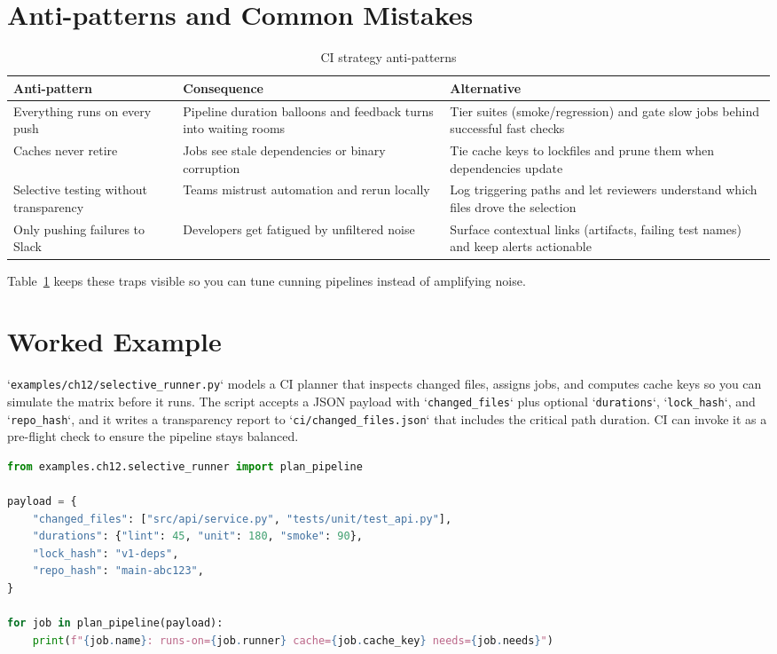 \section{Anti-patterns and Common Mistakes}
\begin{table}[h]
\centering
\caption{CI strategy anti-patterns}
\label{tab:ci-anti-patterns}
\begin{tabular}{p{4cm}p{4cm}p{5cm}}
\toprule
Anti-pattern & Consequence & Alternative \\
\midrule
Everything runs on every push & Pipeline duration balloons and feedback turns into waiting rooms & Tier suites (smoke/regression) and gate slow jobs behind successful fast checks \\
Caches never retire & Jobs see stale dependencies or binary corruption & Tie cache keys to lockfiles and prune them when dependencies update \\
Selective testing without transparency & Teams mistrust automation and rerun locally & Log triggering paths and let reviewers understand which files drove the selection \\
Only pushing failures to Slack & Developers get fatigued by unfiltered noise & Surface contextual links (artifacts, failing test names) and keep alerts actionable \\
\bottomrule
\end{tabular}
\end{table}

Table~\ref{tab:ci-anti-patterns} keeps these traps visible so you can tune cunning pipelines instead of amplifying noise.

\section{Worked Example}
`\texttt{examples/ch12/selective\_runner.py}` models a CI planner that inspects changed files, assigns jobs, and computes cache keys so you can simulate the matrix before it runs. The script accepts a JSON payload with `\texttt{changed\_files}` plus optional `\texttt{durations}`, `\texttt{lock\_hash}`, and `\texttt{repo\_hash}`, and it writes a transparency report to `\texttt{ci/changed\_files.json}` that includes the critical path duration. CI can invoke it as a pre-flight check to ensure the pipeline stays balanced.

\begin{lstlisting}[language=python, caption={CI strategy reporting template.}, label=lst:ch12-ci-strategy]
from examples.ch12.selective_runner import plan_pipeline

payload = {
    "changed_files": ["src/api/service.py", "tests/unit/test_api.py"],
    "durations": {"lint": 45, "unit": 180, "smoke": 90},
    "lock_hash": "v1-deps",
    "repo_hash": "main-abc123",
}

for job in plan_pipeline(payload):
    print(f"{job.name}: runs-on={job.runner} cache={job.cache_key} needs={job.needs}")
\end{lstlisting}

